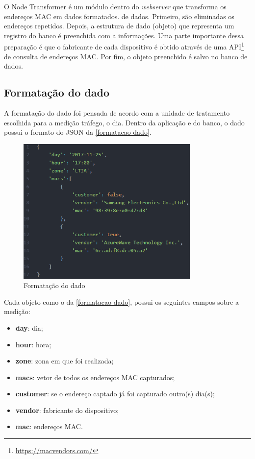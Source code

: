 O Node Transformer é um módulo dentro do \emph{webserver}
que transforma os endereços MAC em dados formatados.
de dados. Primeiro, são eliminadas os endereços repetidos. Depois, a estrutura de dado (objeto)
que representa um registro do banco é preenchida com a informações. Uma parte importante dessa preparação
é que o fabricante de cada dispositivo é obtido através de uma API\footnote{\url{https://macvendors.com/}} de consulta de endereços MAC. Por fim,
o objeto preenchido é salvo no banco de dados.

\subsection{Formatação do dado}
A formatação do dado foi pensada de acordo com a unidade de tratamento escolhida para a medição tráfego, o dia.
Dentro da aplicação e do banco, o dado possui o formato do JSON da \autoref{formatacao-dado}.

\begin{figure}[!h]
  \caption{\label{formatacao-dado}Formatação do dado}
  \begin{center}
    \includegraphics[width=0.8\textwidth]{img/formato-dado.png}
  \end{center}
\end{figure}

Cada objeto como o da \autoref{formatacao-dado}, possui os seguintes campos sobre a medição:
\begin{itemize}
    \item \textbf{day}: dia;
    \item \textbf{hour}: hora;
    \item \textbf{zone}: zona em que foi realizada;
    \item \textbf{macs}: vetor de todos os endereços MAC capturados;
    \item \textbf{customer}: se o endereço captado já foi capturado outro(s) dia(s);
    \item \textbf{vendor}: fabricante do dispositivo;
    \item \textbf{mac}: endereços MAC.
\end{itemize}

